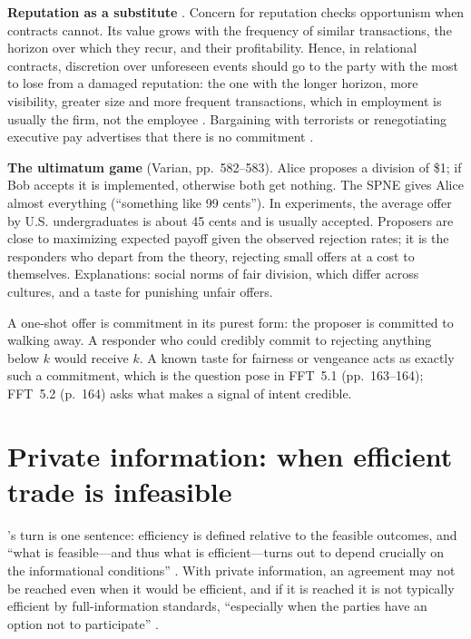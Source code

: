 \textbf{Reputation as a substitute} . Concern for reputation checks opportunism when
contracts cannot. Its value grows with the frequency of similar transactions, the horizon over
which they recur, and their profitability. Hence, in relational contracts, discretion over
unforeseen events should go to the party with the most to lose from a damaged reputation: the
one with the longer horizon, more visibility, greater size and more frequent transactions,
which in employment is usually the firm, not the employee . Bargaining with terrorists
or renegotiating executive pay advertises that there is no commitment .

\textbf{The ultimatum game} (Varian, pp.~582--583). Alice proposes a division of \$1; if Bob
accepts it is implemented, otherwise both get nothing. The SPNE gives Alice almost everything
(``something like 99 cents''). In experiments, the average offer by U.S. undergraduates is about
45 cents and is usually accepted. Proposers are close to maximizing expected payoff given the
observed rejection rates; it is the responders who depart from the theory, rejecting small offers
at a cost to themselves. Explanations: social norms of fair division, which differ across
cultures, and a taste for punishing unfair offers.

\begin{keyidea}
A one-shot offer is commitment in its purest form: the proposer is committed to walking away.
A responder who could credibly commit to rejecting anything below $k$ would receive $k$. A
known taste for fairness or vengeance acts as exactly such a commitment, which is the question
\MR{} pose in FFT~5.1 (pp.~163--164); FFT~5.2 (p.~164) asks what makes a signal of intent
credible.
\end{keyidea}

\section{Private information: when efficient trade is infeasible}\label{sec:b-private}

\MR's turn is one sentence: efficiency is defined relative to the feasible outcomes, and
``what is feasible---and thus what is efficient---turns out to depend crucially on the
informational conditions'' . With private information, an agreement may not be reached
even when it would be efficient, and if it is reached it is not typically efficient by
full-information standards, ``especially when the parties have an option not to participate''
.


